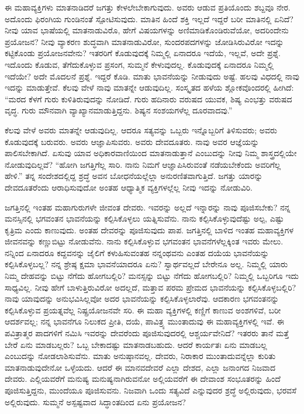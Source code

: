 ಈ ಮಹಾವ್ಯಕ್ತಿಗಳು ಮಾತನಾಡಿದರೆ ಜಗತ್ತು ಕೇಳಲೇಬೇಕಾಗುವುದು. ಅವರು ಆಡುವ ಪ್ರತಿಯೊಂದು ಶಬ್ದವೂ ನೇರ. ಅದೊಂದು ಫಿರಂಗಿಯ ಗುಂಡಿನಂತೆ ಸ್ಪೋಟಿಸು\-ವುದು. ಮಾತಿನ ಹಿಂದೆ ಶಕ್ತಿ ಇಲ್ಲದೆ ಇದ್ದರೆ ಬರೀ ಮಾತಿನಲ್ಲಿ ಏನಿದೆ? ನೀವು ಯಾವ ಭಾಷೆಯಲ್ಲಿ ಮಾತನಾಡುವಿರೊ, ಹೇಗೆ ವಿಷಯಗಳನ್ನು ಅಣಿಮಾಡಿಕೊಂಡಿರುವೆಯೋ, ಅದರಿಂದೇನು ಪ್ರಯೋಜನ? ನೀವು ವ್ಯಾಕರಣ ಶುದ್ಧವಾಗಿ ಮಾತನಾಡುವಿರೋ, ಸುಂದರಪದಗಳನ್ನು ಜೋಡಿಸಿರುವಿರೋ ಇದನ್ನು ಕಟ್ಟಿಕೊಂಡು ಪ್ರಯೋಜನವೇನು? ಇತರರಿಗೆ ಕೊಡುವುದಕ್ಕೆ ನಿಮ್ಮಲ್ಲಿ ಏನಾದರೂ ಇದೆಯೆ, ಇಲ್ಲವೆ, ಅದೇ ಪ್ರಶ್ನೆ. ಇದೊಂದು ಕೊಡುವ, ತೆಗೆದುಕೊಳ್ಳುವ ಪ್ರಸಂಗ, ಸುಮ್ಮನೆ ಕೇಳುವುದಲ್ಲ. ಕೊಡುವುದಕ್ಕೆ ಏನಾದರೂ ನಿಮ್ಮಲ್ಲಿ ಇದೆಯೇ? ಅದೇ ಮೊದಲನೆ ಪ್ರಶ್ನೆ. ಇದ್ದರೆ ಕೊಡಿ. ಮಾತು ಭಾವನೆಯನ್ನು ನೀಡುವುದು ಅಷ್ಟೆ. ಹಲವು ವಿಧದಲ್ಲಿ ನಾವು ಇದನ್ನು ಮಾಡುತ್ತೇವೆ. ಕೆಲವು ವೇಳೆ ನಾವು ಮಾತನ್ನೇ ಆಡುವುದಿಲ್ಲ. ಸಂಸ್ಕೃತದ ಹಳೆಯ ಶ್ಲೋಕವೊಂದರಲ್ಲಿ ಹೀಗಿದೆ: “ಮರದ ಕೆಳಗೆ ಗುರು ಕುಳಿತಿರುವುದನ್ನು ನೋಡಿದೆ. ಗುರು ಹದಿನಾರು ವರುಷದ ಯುವಕ, ಶಿಷ್ಯ ಎಂಭತ್ತು ವರುಷದ ವೃದ್ಧ. ಗುರು ಮೌನವಾಗಿ ವ್ಯಾಖ್ಯಾನಮಾಡುತ್ತಿದ್ದನು. ಶಿಷ್ಯನ ಸಂಶಯಗಳೆಲ್ಲ ದೂರವಾದವು.”

ಕೆಲವು ವೇಳೆ ಅವರು ಮಾತನ್ನೇ ಆಡುವುದಿಲ್ಲ. ಆದರೂ ಸತ್ಯವನ್ನು ಒಬ್ಬರು ಇನ್ನೊಬ್ಬರಿಗೆ ತಿಳಿಸುವರು; ಅವರು ಕೊಡುವುದಕ್ಕೆ ಬರುವರು. ಅವರು ಆಜ್ಞಾಪಿಸುವರು. ಅವರು ದೇವದೂತರು. ನಾವು ಅವರ ಆಜ್ಞೆಯನ್ನು ಪಾಲಿಸಬೇಕಾಗಿದೆ. ಏಸುವು ಯಾವ ಅಧಿಕಾರವಾಣಿಯಿಂದ ಮಾತನಾಡುತ್ತಾನೆ ಎಂಬುದನ್ನು ನೀವು ನಿಮ್ಮ ಶಾಸ್ತ್ರದಲ್ಲಿಯೇ ನೋಡುವುದಿಲ್ಲವೆ? “ಹೋಗಿ ಜಗತ್ತಿಗೆಲ್ಲ ಸಾರಿ. ನಾನು ನಿಮಗೆ ಆಜ್ಞಾಪಿಸಿರುವಂತೆ ನಡೆಯಬೇಕೆಂದು ಅವರಿಗೆಲ್ಲ ಹೇಳಿ.” ತನ್ನ ಸಂದೇಶದಲ್ಲಿದ್ದ ಶ್ರದ್ಧೆ ಅವನ ಬೋಧನೆಯಲ್ಲೆಲ್ಲಾ ಅನುರಣಿತವಾಗುತ್ತಿದೆ. ಜಗತ್ತು ಯಾರನ್ನು ದೇವದೂತರೆಂದು ಆರಾಧಿಸುವುದೋ ಅಂತಹ ಆಧ್ಯಾತ್ಮಿಕ ವ್ಯಕ್ತಿಗಳಲ್ಲೆಲ್ಲ ನೀವು ಇದನ್ನು ನೋಡುವಿರಿ.

ಜಗತ್ತಿನಲ್ಲಿ ಇಂತಹ ಮಹಾಗುರುಗಳೇ ಜೀವಂತ ದೇವರು. ಇವರನ್ನು ಅಲ್ಲದೆ ಇನ್ನಾರನ್ನು ನಾವು ಪೂಜಿಸಬೇಕು? ನನ್ನ ಮನಸ್ಸಿನಲ್ಲಿ ಭಗವಂತನ ಭಾವನೆಯನ್ನು ಕಲ್ಪಿಸಿಕೊಳ್ಳಲು ಯತ್ನಿಸುವೆನು. ನಾನು ಕಲ್ಪಿಸಿಕೊಳ್ಳುವುದೆಷ್ಟು ಅಲ್ಪ, ಎಷ್ಟು ಕೃತ್ರಿಮ ಎಂದು ಕಾಣುವುದು. ಅಂತಹ ದೇವರನ್ನು ಪೂಜಿಸುವುದು ಪಾಪ. ಜಗತ್ತಿನಲ್ಲಿ ಬಾಳಿದ ಇಂತಹ ಮಹಾವ್ಯಕ್ತಿಗಳ ಜೀವನವನ್ನು ಕಣ್ಣುಬಿಟ್ಟು ನೋಡುವೆನು. ನಾನು ಕಲ್ಪಿಸಿಕೊಳ್ಳುವ ಭಗವಂತನ ಭಾವನೆಗಳೆಲ್ಲಕ್ಕಿಂತ ಇವರು ಮೇಲು. ನನ್ನಿಂದ ಏನಾದರೂ ಕದ್ದವನನ್ನು ಜೈಲಿಗೆ ಕಳುಹಿಸುವಂತಹ ನನ್ನಂಥವನು ಎಂತಹ ದಯೆಯ ಭಾವನೆಯನ್ನು ಕಲ್ಪಿಸಿಕೊಳ್ಳಬಲ್ಲ? ನನ್ನ ಶ್ರೇಷ್ಠ ಕ್ಷಮಾ ಭಾವನೆಯಾದರೂ ಏನು? ಸ್ವಾರ್ಥವಲ್ಲದೆ ಬೇರೇನೂ ಅಲ್ಲ. ನಿಮ್ಮಲ್ಲಿ ಯಾರು ನಿಮ್ಮ ದೇಹವನ್ನು ಬಿಟ್ಟು ನೆಗೆದು ಹೋಗಬಲ್ಲಿರಿ? ಮನಸ್ಸನ್ನು ಬಿಟ್ಟು ನೆಗೆದು ಹೋಗಬಲ್ಲಿರಿ? ನಿಮ್ಮಲ್ಲಿ ಒಬ್ಬರಿಗೂ ಇದು ಸಾಧ್ಯವಿಲ್ಲ. ನೀವು ಹೇಗೆ ಬಾಳುತ್ತಿರುವಿರೋ ಅದಲ್ಲದೆ, ಮತ್ತಾವ ಪರಮ ಪ್ರೇಮದ ಭಾವನೆಯನ್ನು ಕಲ್ಪಿಸಿಕೊಳ್ಳಬಲ್ಲಿರಿ? ನಾವು ಯಾವುದನ್ನು ಅನುಭವಿಸಿಲ್ಲವೋ ಅದರ ಭಾವನೆಯನ್ನು ಕಲ್ಪಿಸಿಕೊಳ್ಳಲಾರೆವು. ಆದಕಾರಣ ಭಗವಂತನನ್ನು ಕಲ್ಪಿಸಿಕೊಳ್ಳುವ ಪ್ರಯತ್ನವೆಲ್ಲ ನಿಷ್ಪ್ರಯೋಜನವೇ ಸರಿ. ಈ ಮಹಾ ವ್ಯಕ್ತಿಗಳಲ್ಲಿ ಕಣ್ಣಿಗೆ ಕಾಣುವ ಅಂಶಗಳಿವೆ, ಬರೀ ಆದರ್ಶವಲ್ಲ; ನನ್ನ ಭಾವನೆಗೂ ನಿಲುಕದ ಪ್ರೀತಿ, ದಯೆ, ಪಾವಿತ್ರ್ಯ ಮುಂತಾದುವು ಈ ಮಹಾವ್ಯಕ್ತಿಗಳಲ್ಲಿ ಇವೆ. ಈ ಪವಿತ್ರಾತ್ಮರ ಪಾದಗಳಿಗೆ ನಮಿಸಿ ಇವರನ್ನು ದೇವರೆಂದು ಪೂಜಿಸುವುದರಲ್ಲಿ ಆಶ್ಚರ್ಯವೇನಿದೆ? ಇತರರು ತಾನೆ ಮತ್ತೆ ಬೇರೆ ಏನು ಮಾಡಬಲ್ಲರು? ಒಬ್ಬ ಬೇಕಾದಷ್ಟು ಮಾತನಾಡಬಹುದು. ಆದರೆ ಕಾರ್ಯತಃ ಏನು ಮಾಡಬಲ್ಲ ಎಂಬುದನ್ನು ನೋಡಲಾಶಿಸುವೆನು. ಮಾತು ಅನುಷ್ಠಾನವಲ್ಲ. ದೇವರು, ನಿರಾಕಾರ ಮುಂತಾದುವನ್ನೆಲ್ಲಾ ಕುರಿತು ಮಾತನಾಡುವುದೇನೋ ಒಳ್ಳೆಯದು. ಆದರೆ ಈ ಮಾನವದೇವರೆ ಎಲ್ಲಾ ದೇಶದ, ಎಲ್ಲಾ ಜನಾಂಗದ ನಿಜವಾದ ದೇವರು. ಎಲ್ಲಿಯವರೆಗೆ ಮನುಷ್ಯ ಮನುಷ್ಯನಾಗಿರುವನೋ ಅಲ್ಲಿಯವರೆಗೆ ಈ ದೇವಾಂಶ ಸಂಭೂತರನ್ನು ಹಿಂದೆ ಪೂಜಿಸುತ್ತಿದ್ದನು, ಮುಂದೆಯೂ ಪೂಜಿಸುವನು. ನಿಜವಾಗಿ ಒಂದು ಸತ್ಯವಿದೆ ಎನ್ನುವುದರ ಶ್ರದ್ಧೆ ಅಲ್ಲಿರುವುದು, ಭರವಸೆ ಅಲ್ಲಿರುವುದು. ಸುಮ್ಮನೆ ಅಸ್ಪಷ್ಟವಾದ ಸಿದ್ಧಾಂತದಿಂದ ಏನು ಪ್ರಯೋಜನ?

